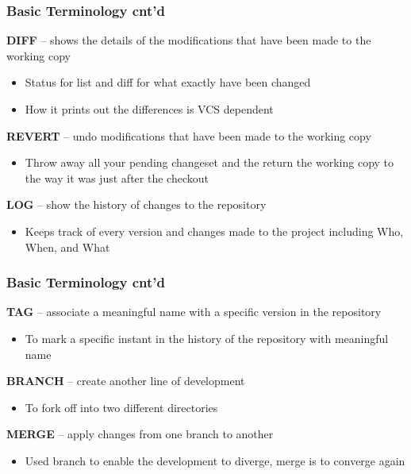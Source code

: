 \documentclass[newPxFont,sthlmFooter,nooffset]{beamer}
\begin{document}
\begin{frame}[t]
  \frametitle{Basic Terminology cnt'd}
\textbf{DIFF} – shows the details of the modifications that have been made to the working copy
\begin{itemize}
\item Status for list and diff for what exactly have been changed
\item How it prints out the differences is VCS dependent
\end{itemize}


\textbf{REVERT} – undo modifications that have been made to the working copy
\begin{itemize}
\item Throw away all your pending changeset and the return the working
  copy to the way it was just after the checkout
\end{itemize}

\textbf{LOG} – show the history of changes to the repository
\begin{itemize}
\item Keeps track of every version and changes made to the project including Who, When, and What
\end{itemize}

\end{frame}


\begin{frame}[t]
  \frametitle{Basic Terminology cnt'd}

\textbf{TAG} – associate a meaningful name with a specific version in the repository
\begin{itemize}
\item To mark a specific instant in the history of the repository with
  meaningful name
\end{itemize}


\textbf{BRANCH} – create another line of development
\begin{itemize}
\item To fork off into two different directories
\end{itemize}

\textbf{MERGE} – apply changes from one branch to another
\begin{itemize}
\item Used branch to enable the development to diverge, merge is to
  converge again
\end{itemize}

\end{frame}
\end{document}
